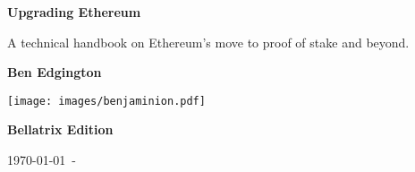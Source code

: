 \begin{titlepage}

   \begin{center}

     \vspace*{1.0cm}

     \Huge

     \textbf{Upgrading Ethereum}

     \vfill

     \Large

     A technical handbook on Ethereum's move to proof of stake and beyond.

     \vfill

     \textbf{Ben Edgington}

     \vfill

     \texttt{[image: images/benjaminion.pdf]}

     \vfill

     \textbf{Bellatrix Edition}

     \vfill

     \normalsize

     \today\ - \href{https://github.com/benjaminion/upgrading-ethereum-book}{\texttt{}}

   \end{center}
   \restoregeometry
\end{titlepage}
